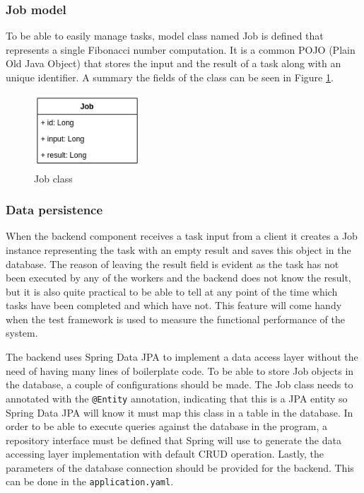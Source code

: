 \subsubsection{Job model}


To be able to easily manage tasks, model class named Job is defined that represents a single Fibonacci number computation. It is a common POJO (Plain Old Java Object) that stores the input and the result of a task along with an unique identifier. A summary the fields of the class can be seen in Figure \ref{fig:job_model}.

\begin{figure}[h]
	\centering
	\includegraphics[width=40mm, keepaspectratio]{figures/job_class.png}
	\caption{Job class}
	\label{fig:job_model}
\end{figure}

\subsubsection{Data persistence}

When the backend component receives a task input from a client it creates a Job instance representing the task with an empty result and saves this object in the database. The reason of leaving the result field is evident as the task has not been executed by any of the workers and the backend does not know the result, but it is also quite practical to be able to tell at any point of the time which tasks have been completed and which have not. This feature will come handy when the test framework is used to measure the functional performance of the system.

The backend uses Spring Data JPA \cite{SpringDataJPA} to implement a data access layer without the need of having many lines of boilerplate code. To be able to store Job objects in the database, a couple of configurations should be made. The Job class needs to annotated with the \texttt{@Entity} annotation, indicating that this is a JPA entity so Spring Data JPA will know it must map this class in a table in the database. In order to be able to execute queries against the database in the program, a repository interface must be defined that Spring will use to generate the data accessing layer implementation with default CRUD operation. Lastly, the parameters of the database connection should be provided for the backend. This can be done in the \texttt{application.yaml}.

